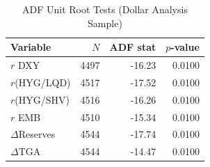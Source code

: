 \begin{table}[H]
\centering
\begin{tabular}{lrrr}
  \toprule
Variable & $N$ & ADF stat & $p$-value \\ 
  \midrule
$r$ DXY & 4497 & -16.23 & 0.0100 \\ 
  $r$(HYG/LQD) & 4517 & -17.52 & 0.0100 \\ 
  $r$(HYG/SHV) & 4516 & -16.26 & 0.0100 \\ 
  $r$ EMB & 4510 & -15.34 & 0.0100 \\ 
  $\Delta$Reserves & 4544 & -17.74 & 0.0100 \\ 
  $\Delta$TGA & 4544 & -14.47 & 0.0100 \\ 
   \bottomrule
\end{tabular}
\caption{ADF Unit Root Tests (Dollar Analysis Sample)} 
\label{tab:adf_dollar}
\end{table}
